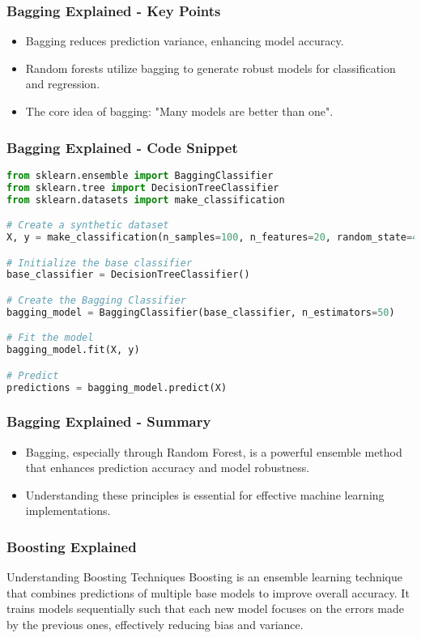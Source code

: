 \documentclass[aspectratio=169]{beamer}
\begin{document}
\begin{frame}[fragile]
    \frametitle{Bagging Explained - Key Points}
    \begin{itemize}
        \item Bagging reduces prediction variance, enhancing model accuracy.
        \item Random forests utilize bagging to generate robust models for classification and regression.
        \item The core idea of bagging: "Many models are better than one".
    \end{itemize}
\end{frame}

\begin{frame}[fragile]
    \frametitle{Bagging Explained - Code Snippet}
    \begin{lstlisting}[language=Python]
from sklearn.ensemble import BaggingClassifier
from sklearn.tree import DecisionTreeClassifier
from sklearn.datasets import make_classification

# Create a synthetic dataset
X, y = make_classification(n_samples=100, n_features=20, random_state=42)

# Initialize the base classifier
base_classifier = DecisionTreeClassifier()

# Create the Bagging Classifier
bagging_model = BaggingClassifier(base_classifier, n_estimators=50)

# Fit the model
bagging_model.fit(X, y)

# Predict
predictions = bagging_model.predict(X)
    \end{lstlisting}
\end{frame}

\begin{frame}[fragile]
    \frametitle{Bagging Explained - Summary}
    \begin{itemize}
        \item Bagging, especially through Random Forest, is a powerful ensemble method that enhances prediction accuracy and model robustness.
        \item Understanding these principles is essential for effective machine learning implementations.
    \end{itemize}
\end{frame}

\begin{frame}[fragile]
    \frametitle{Boosting Explained}
    \begin{block}{Understanding Boosting Techniques}
        Boosting is an ensemble learning technique that combines predictions of multiple base models to improve overall accuracy. It trains models sequentially such that each new model focuses on the errors made by the previous ones, effectively reducing bias and variance.
    \end{block}
\end{frame}
\end{document}
